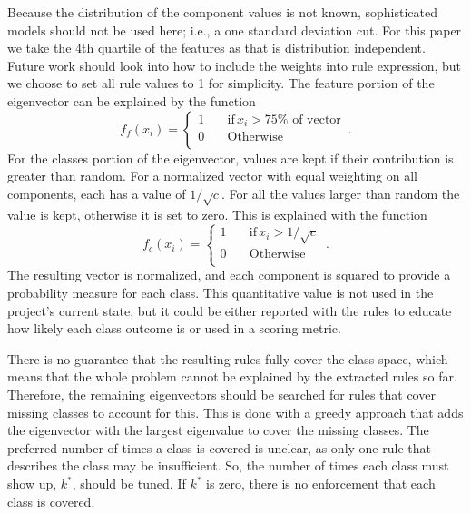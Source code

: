 \documentclass[11pt]{article}
\begin{document}
Because the distribution of the component values is not known, sophisticated models should not be used here; i.e., a one standard deviation cut. For this paper we take the 4th quartile of the features as that is distribution independent. Future work should look into how to include the weights into rule expression, but we choose to set all rule values to 1 for simplicity. The feature portion of the eigenvector can be explained by the function
\begin{equation}
f_f(x_i)=\begin{cases}
          1 \quad &\text{if} \, x_i > 75\% \text{ of vector} \\
          0 \quad &\text{Otherwise} \\
     \end{cases} \, .
\end{equation}
For the classes portion of the eigenvector, values are kept if their contribution is greater than random. For a normalized vector with equal weighting on all components, each has a value of $1/\sqrt{c}$. For all the values larger than random the value is kept, otherwise it is set to zero. This is explained with the function
\begin{equation}
f_c(x_i)=\begin{cases}
          1 \quad &\text{if} \, x_i > 1/\sqrt{c} \\
          0 \quad &\text{Otherwise} \\
     \end{cases} \, .
\end{equation}
The resulting vector is normalized, and each component is squared to provide a probability measure for each class. This quantitative value is not used in the project's current state, but it could be either reported with the rules to educate how likely each class outcome is or used in a scoring metric.

There is no guarantee that the resulting rules fully cover the class space, which means that the whole problem cannot be explained by the extracted rules so far. Therefore, the remaining eigenvectors should be searched for rules that cover missing classes to account for this. This is done with a greedy approach that adds the eigenvector with the largest eigenvalue to cover the missing classes. The preferred number of times a class is covered is unclear, as only one rule that describes the class may be insufficient. So, the number of times each class must show up, $k^*$, should be tuned. If $k^*$ is zero, there is no enforcement that each class is covered. 
\end{document}
